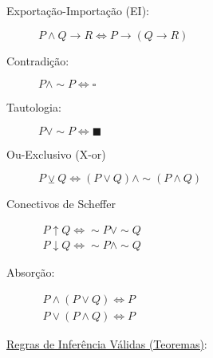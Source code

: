 \documentclass[12pt, a4paper,final]{article}
\begin{document}
\begin{description}
    \item[Exportação-Importação (EI):] $P\wedge Q\rightarrow R \Leftrightarrow P\rightarrow(Q\rightarrow R)$
    
    \item[Contradição:] $P\wedge \sim P \Leftrightarrow \square $
    
    \item[Tautologia:] $ P\vee \sim P \Leftrightarrow \blacksquare    $
    
    \item[Ou-Exclusivo (X-or)] $P \veebar Q \Leftrightarrow (P \vee Q) \wedge \sim (P \wedge Q)$
    
    \item[Conectivos de Scheffer] $\begin{array}{l} P \uparrow Q \Leftrightarrow \sim P \vee \sim Q \\  P \downarrow Q \Leftrightarrow \sim P \wedge \sim Q \end{array}$
    
    \item [Absorção:] $\begin{array}{l}P \wedge (P \vee Q) \Leftrightarrow P\\P \vee (P \wedge Q) \Leftrightarrow P\end{array}$
    
\end{description}

\vskip 1cm


\underline{{\Large Regras de Inferência Válidas (Teoremas)}}:
\end{document}

